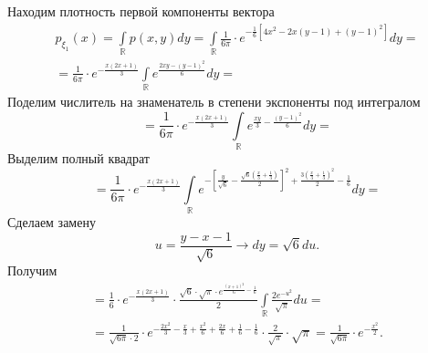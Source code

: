 \begin{enumerate}[label=\alph*)]
  Находим плотность первой компоненты вектора
  \begin{gather*}
    p_{ \xi_1} \left( x \right) =
    \int \limits_{ \mathbb{R}} p \left( x, y \right) dy =
    \int \limits_{ \mathbb{R}} \frac{1}{6 \pi } \cdot
      e^{-\frac{1}{6} \left[ 4x^2 - 2x \left( y - 1 \right) + \left( y - 1 \right)^2 \right] }
    dy = \\
    = \frac{1}{6 \pi } \cdot e^{-\frac{x \left( 2x + 1 \right) }{3}}
    \int \limits_{ \mathbb{R}} e^{ \frac{2xy - \left( y - 1 \right)^2}{6}} dy =
  \end{gather*}
  Поделим числитель на знаменатель в степени экспоненты под интегралом
  \begin{equation*}
    = \frac{1}{6 \pi } \cdot e^{-\frac{x \left( 2x + 1 \right) }{3}}
    \int \limits_{ \mathbb{R}}
      e^{ \frac{xy}{3} - \frac{ \left( y - 1 \right)^2}{6}}
    dy =
  \end{equation*}
  Выделим полный квадрат
  \begin{equation*}
    = \frac{1}{6 \pi } \cdot e^{-\frac{x \left( 2x + 1 \right) }{3}}
    \int \limits_{ \mathbb{R}}
      e^{-\left[ \frac{y}{ \sqrt{6}} - \frac{ \sqrt{6} \left( \frac{x}{3} + \frac{1}{3} \right) }{2} \right]^2 + \frac{3 \left( \frac{x}{3} + \frac{1}{3} \right)^2}{2} - \frac{1}{6}}
    dy =
  \end{equation*}
  Сделаем замену
  \begin{equation*}
    u = \frac{y - x - 1}{ \sqrt{6}} \rightarrow
    dy = \sqrt{6} du.
  \end{equation*}
  Получим
  \begin{gather*}
    = \frac{1}{6} \cdot e^{-\frac{x \left( 2x + 1 \right) }{3}} \cdot
    \frac{ \sqrt{6} \cdot \sqrt{ \pi } \cdot e^{ \frac{ \left( x + 1 \right)^2}{6} - \frac{1}{6}}}{2}
    \int \limits_{ \mathbb{R}} \frac{2e^{-u^2}}{ \sqrt{ \pi }} du = \\
    = \frac{1}{ \sqrt{6 \pi } \cdot 2} \cdot
    e^{-\frac{2x^2}{3} - \frac{x}{3} + \frac{x^2}{6} + \frac{2x}{6} + \frac{1}{6} - \frac{1}{6}} \cdot
    \frac{2}{ \sqrt{ \pi }} \cdot \sqrt{ \pi } =
    \frac{1}{ \sqrt{6 \pi }} \cdot e^{-\frac{x^2}{2}}.
  \end{gather*}


\end{enumerate}

